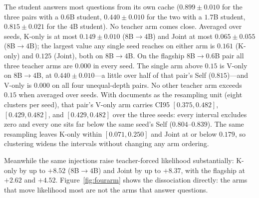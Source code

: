 \documentclass[11pt]{article}
\begin{document}
The student answers most questions from its own cache ($0.899 \pm 0.010$ for the
three pairs with a $0.6$B student, $0.440 \pm 0.010$ for the two with a $1.7$B
student, $0.815 \pm 0.021$ for the $4$B student). No teacher arm comes close.
Averaged over seeds, K-only is at most $0.149 \pm 0.010$ ($8$B$\to4$B) and Joint
at most $0.065 \pm 0.055$ ($8$B$\to4$B); the largest value any single seed
reaches on either arm is $0.161$ (K-only) and $0.125$ (Joint), both on
$8$B$\to4$B. On the flagship $8$B$\to0.6$B pair all three
teacher arms are $0.000$ in every seed. The single arm above $0.15$ is V-only on
$8$B$\to4$B, at $0.440 \pm 0.010$---a little over half of that pair's Self
($0.815$)---and V-only is $0.000$ on all four unequal-depth pairs. No other
teacher arm exceeds $0.15$ when averaged over seeds. With documents as the
resampling unit (eight clusters per seed), that pair's V-only arm carries CI95
$[0.375, 0.482]$, $[0.429, 0.482]$, and $[0.429, 0.482]$ over the three seeds:
every interval excludes zero and every one sits far below the same seed's Self
($0.804$--$0.839$). The same resampling leaves K-only within $[0.071, 0.250]$
and Joint at or below $0.179$, so clustering widens the intervals without
changing any arm ordering.

Meanwhile the same injections raise teacher-forced likelihood substantially:
K-only by up to $+8.52$ ($8$B$\to4$B) and Joint by up to $+8.37$, with the
flagship at $+2.62$ and $+4.52$. Figure~\ref{fig:fourarm} shows the dissociation
directly: the arms that move likelihood most are not the arms that answer
questions.
\end{document}
